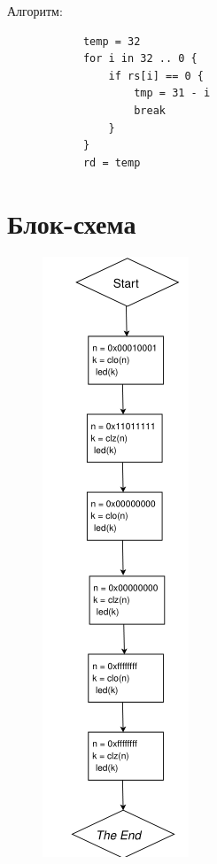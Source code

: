 \documentclass[a4paper, 10pt]{article}
\begin{document}
        Алгоритм:
        \begin{verbatim}
            temp = 32
            for i in 32 .. 0 {
                if rs[i] == 0 {
                    tmp = 31 - i
                    break
                }
            }
            rd = temp
        \end{verbatim}

     \section*{Блок-схема}
             \begin{figure}[H]
                 \includegraphics[scale=0.7]{../images/code_schema.png}
             \end{figure}
\end{document}

